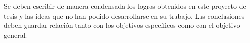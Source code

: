 
Se deben escribir de manera condensada los logros obtenidos en este proyecto de tesis y las ideas que no han podido desarrollarse en su trabajo. Las conclusiones deben guardar relación tanto con los objetivos específicos como con el objetivo general. %
